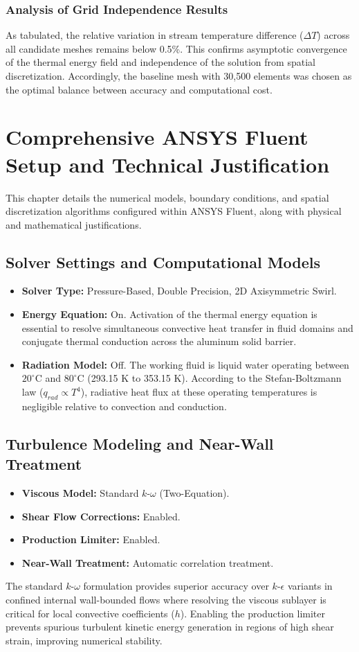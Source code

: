 \documentclass[12pt,a4paper]{report}
\begin{document}
\subsection{Analysis of Grid Independence Results}
As tabulated, the relative variation in stream temperature difference ($\Delta T$) across all candidate meshes remains below 0.5\%. This confirms asymptotic convergence of the thermal energy field and independence of the solution from spatial discretization. Accordingly, the baseline mesh with 30,500 elements was chosen as the optimal balance between accuracy and computational cost.


\chapter{Comprehensive ANSYS Fluent Setup and Technical Justification}
This chapter details the numerical models, boundary conditions, and spatial discretization algorithms configured within ANSYS Fluent, along with physical and mathematical justifications.

\section{Solver Settings and Computational Models}
\begin{itemize}
    \item \textbf{Solver Type:} Pressure-Based, Double Precision, 2D Axisymmetric Swirl.
    \item \textbf{Energy Equation:} On. Activation of the thermal energy equation is essential to resolve simultaneous convective heat transfer in fluid domains and conjugate thermal conduction across the aluminum solid barrier.
    \item \textbf{Radiation Model:} Off. The working fluid is liquid water operating between $20^\circ\text{C}$ and $80^\circ\text{C}$ (293.15 K to 353.15 K). According to the Stefan-Boltzmann law ($q_{rad} \propto T^4$), radiative heat flux at these operating temperatures is negligible relative to convection and conduction.
\end{itemize}

\section{Turbulence Modeling and Near-Wall Treatment}
\begin{itemize}
    \item \textbf{Viscous Model:} Standard $k$-$\omega$ (Two-Equation).
    \item \textbf{Shear Flow Corrections:} Enabled.
    \item \textbf{Production Limiter:} Enabled.
    \item \textbf{Near-Wall Treatment:} Automatic correlation treatment.
\end{itemize}
The standard $k$-$\omega$ formulation provides superior accuracy over $k$-$\epsilon$ variants in confined internal wall-bounded flows where resolving the viscous sublayer is critical for local convective coefficients ($h$). Enabling the production limiter prevents spurious turbulent kinetic energy generation in regions of high shear strain, improving numerical stability.
\end{document}

